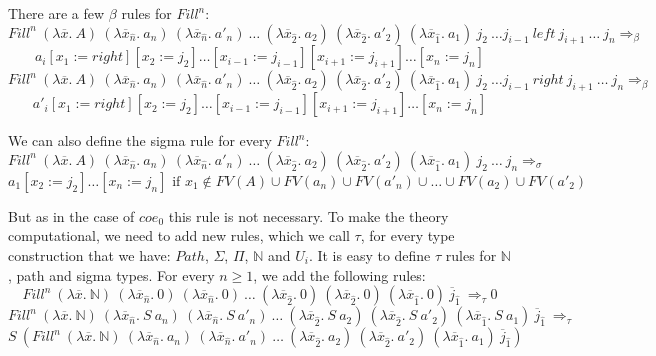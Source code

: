 \documentclass{amsart}
\theoremstyle{definition}
\theoremstyle{remark}
\newcommand{\red}{\Rightarrow}
\numberwithin{figure}{section}
\begin{document}
There are a few $\beta$ rules for $Fill^n$:
\[ Fill^n\ (\lambda \overline{x}.\ A)\ (\lambda \overline{x}_{\hat{n}}.\ a_n)\ (\lambda \overline{x}_{\hat{n}}.\ a'_n)\ \ldots\ (\lambda \overline{x}_{\hat{2}}.\ a_2)\ (\lambda \overline{x}_{\hat{2}}.\ a'_2)\ (\lambda \overline{x}_{\hat{1}}.\ a_1)\ j_2\ \ldots j_{i-1}\ left\ j_{i+1}\ \ldots\ j_n \red_\beta \]
\[ a_i[x_1 := right][x_2 := j_2] \ldots [x_{i-1} := j_{i-1}] [x_{i+1} := j_{i+1}] \ldots [x_n := j_n] \]
\[ Fill^n\ (\lambda \overline{x}.\ A)\ (\lambda \overline{x}_{\hat{n}}.\ a_n)\ (\lambda \overline{x}_{\hat{n}}.\ a'_n)\ \ldots\ (\lambda \overline{x}_{\hat{2}}.\ a_2)\ (\lambda \overline{x}_{\hat{2}}.\ a'_2)\ (\lambda \overline{x}_{\hat{1}}.\ a_1)\ j_2\ \ldots j_{i-1}\ right\ j_{i+1}\ \ldots\ j_n \red_\beta \]
\[ a'_i[x_1 := right][x_2 := j_2] \ldots [x_{i-1} := j_{i-1}] [x_{i+1} := j_{i+1}] \ldots [x_n := j_n] \]

We can also define the sigma rule for every $Fill^n$:
\[ Fill^n\ (\lambda \overline{x}.\ A)\ (\lambda \overline{x}_{\hat{n}}.\ a_n)\ (\lambda \overline{x}_{\hat{n}}.\ a'_n)\ \ldots\ (\lambda \overline{x}_{\hat{2}}.\ a_2)\ (\lambda \overline{x}_{\hat{2}}.\ a'_2)\ (\lambda \overline{x}_{\hat{1}}.\ a_1)\ j_2\ \ldots\ j_n \red_\sigma \]
\[ a_1[x_2 := j_2] \ldots [x_n := j_n] \text{ if } x_1 \notin FV(A) \cup FV(a_n) \cup FV(a'_n) \cup \ldots \cup FV(a_2) \cup FV(a'_2) \]

But as in the case of $coe_0$ this rule is not necessary.
To make the theory computational, we need to add new rules, which we call $\tau$, for every type construction that we have: $Path$, $\Sigma$, $\Pi$, $\mathbb{N}$ and $U_i$.
It is easy to define $\tau$ rules for $\mathbb{N}$, path and sigma types.
For every $n \geq 1$, we add the following rules:
\[ Fill^n\ (\lambda \overline{x}.\ \mathbb{N})\ (\lambda \overline{x}_{\hat{n}}.\ 0)\ (\lambda \overline{x}_{\hat{n}}.\ 0)\ \ldots\ (\lambda \overline{x}_{\hat{2}}.\ 0)\ (\lambda \overline{x}_{\hat{2}}.\ 0)\ (\lambda \overline{x}_{\hat{1}}.\ 0)\ \overline{j}_{\hat{1}}\ \red_\tau 0 \]
\[ Fill^n\ (\lambda \overline{x}.\ \mathbb{N})\ (\lambda \overline{x}_{\hat{n}}.\ S\ a_n)\ (\lambda \overline{x}_{\hat{n}}.\ S\ a'_n)\ \ldots\ (\lambda \overline{x}_{\hat{2}}.\ S\ a_2)\ (\lambda \overline{x}_{\hat{2}}.\ S\ a'_2)\ (\lambda \overline{x}_{\hat{1}}.\ S\ a_1)\ \overline{j}_{\hat{1}}\ \red_\tau \]
\[ S\ (Fill^n\ (\lambda \overline{x}.\ \mathbb{N})\ (\lambda \overline{x}_{\hat{n}}.\ a_n)\ (\lambda \overline{x}_{\hat{n}}.\ a'_n)\ \ldots\ (\lambda \overline{x}_{\hat{2}}.\ a_2)\ (\lambda \overline{x}_{\hat{2}}.\ a'_2)\ (\lambda \overline{x}_{\hat{1}}.\ a_1)\ \overline{j}_{\hat{1}}) \]
\end{document}
